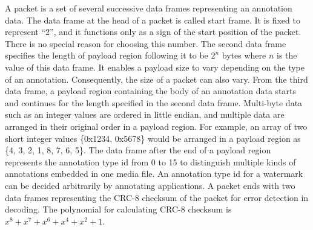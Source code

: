 A packet is a set of several successive data frames representing an annotation data.
The data frame at the head of a packet is called start frame. It is fixed to represent ``2'', and it functions only as a sign of the start position of the packet. There is no special reason for choosing this number.
The second data frame specifies the length of payload region following it to be $ 2^n $ bytes where $n$ is the value of this data frame. It enables a payload size to vary depending on the type of an annotation. Consequently, the size of a packet can also vary.
From the third data frame, a payload region containing the body of an annotation data starts and continues for the length specified in the second data frame.
Multi-byte data such as an integer values are ordered in little endian, and multiple data are arranged in their original order in a payload region.
For example, an array of two short integer values \{0x1234, 0x5678\} would be arranged in a payload region as \{4, 3, 2, 1, 8, 7, 6, 5\}.
The data frame after the end of a payload region represents the annotation type id from 0 to 15 to distinguish multiple kinds of annotations embedded in one media file.
An annotation type id for a watermark can be decided arbitrarily by annotating applications.
A packet ends with two data frames representing the CRC-8 checksum of the packet for error detection in decoding. The polynomial for calculating CRC-8 checksum is $x^8 + x^7 + x^6 + x^4 + x^2 + 1$.
